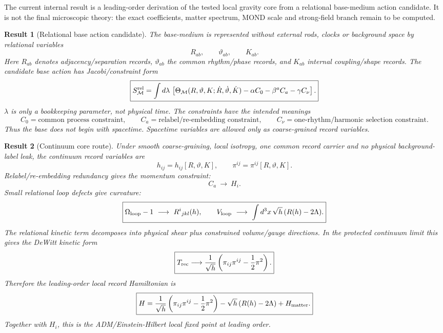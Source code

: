 \documentclass[11pt]{article}
\newtheorem{result}{Result}
\begin{document}
The current internal result is a leading-order derivation of the tested local
gravity core from a relational base-medium action candidate.  It is not the
final microscopic theory: the exact coefficients, matter spectrum, MOND scale
and strong-field branch remain to be computed.

\begin{result}[Relational base action candidate]
The base-medium is represented without external rods, clocks or background
space by relational variables
\[
\boxed{
R_{ab},\qquad \vartheta_{ab},\qquad K_{ab}.
}
\]
Here \(R_{ab}\) denotes adjacency/separation records, \(\vartheta_{ab}\) the
common rhythm/phase records, and \(K_{ab}\) internal coupling/shape records.
The candidate base action has Jacobi/constraint form
\[
\boxed{
S_{\mathcal M}^{\rm rel}
=
\int d\lambda\,
\left[
\Theta_{\mathcal M}
(R,\vartheta,K;\dot R,\dot\vartheta,\dot K)
-
\alpha C_0
-
\beta^a C_a
-
\gamma C_\nu
\right].
}
\]
\(\lambda\) is only a bookkeeping parameter, not physical time.  The
constraints have the intended meanings
\[
\boxed{
C_0=\text{common process constraint},\qquad
C_a=\text{relabel/re-embedding constraint},\qquad
C_\nu=\text{one-rhythm/harmonic selection constraint}.
}
\]
Thus the base does not begin with spacetime.  Spacetime variables are allowed
only as coarse-grained record variables.
\end{result}

\begin{result}[Continuum core route]
Under smooth coarse-graining, local isotropy, one common record carrier and no
physical background-label leak, the continuum record variables are
\[
\boxed{
h_{ij}=h_{ij}[R,\vartheta,K],
\qquad
\pi^{ij}=\pi^{ij}[R,\vartheta,K].
}
\]
Relabel/re-embedding redundancy gives the momentum constraint:
\[
\boxed{
C_a\ \longrightarrow\ H_i.
}
\]
Small relational loop defects give curvature:
\[
\boxed{
\Omega_{\rm loop}-1\ \longrightarrow\ R^i{}_{jkl}(h),
\qquad
V_{\rm loop}\ \longrightarrow\ \int d^3x\,\sqrt h\,(R(h)-2\Lambda).
}
\]
The relational kinetic term decomposes into physical shear plus constrained
volume/gauge directions.  In the protected continuum limit this gives the
DeWitt kinetic form
\[
\boxed{
T_{\rm rec}
\longrightarrow
\frac{1}{\sqrt h}
\left(
\pi_{ij}\pi^{ij}
-\frac12\pi^2
\right).
}
\]
Therefore the leading-order local record Hamiltonian is
\[
\boxed{
H
=
\frac{1}{\sqrt h}
\left(
\pi_{ij}\pi^{ij}
-\frac12\pi^2
\right)
-\sqrt h\,(R(h)-2\Lambda)
+H_{\rm matter}.
}
\]
Together with \(H_i\), this is the ADM/Einstein-Hilbert local fixed point at
leading order.
\end{result}
\end{document}
